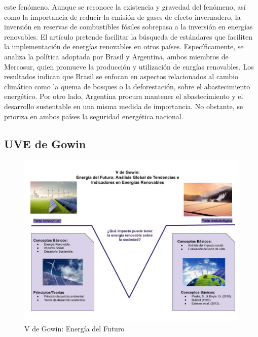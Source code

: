 \documentclass[
  letterpaper,
  DIV=11,
  numbers=noendperiod]{scrreprt}
\begin{document}
\begin{itemize}
  este fenómeno. Aunque se reconoce la existencia y gravedad del
  fenómeno, así como la importancia de reducir la emisión de gases de
  efecto invernadero, la inversión en reservas de combustibles fósiles
  sobrepasa a la inversión en energías renovables. El artículo pretende
  facilitar la búsqueda de estándares que faciliten la implementación de
  energías renovables en otros países. Específicamente, se analiza la
  política adoptada por Brasil y Argentina, ambos miembros de Mercosur,
  quien promueve la producción y utilización de enrgías renovables. Los
  resultados indican que Brasil se enfocan en aspectos relacionados al
  cambio climático como la quema de bosques o la deforestación, sobre el
  abastecimiento energético. Por otro lado, Argentina procura mantener
  el abastecimiento y el desarrollo sustentable en una misma medida de
  importancia. No obstante, se prioriza en ambos países la seguridad
  energética nacional.
\end{itemize}

\subsection{UVE de Gowin}\label{uve-de-gowin}

\begin{figure}[H]

{\centering \includegraphics[width=1\textwidth,height=\textheight]{Dibujo-sin-título.jpg}

}

\caption{V de Gowin: Energía del Futuro}

\end{figure}%
\end{document}
